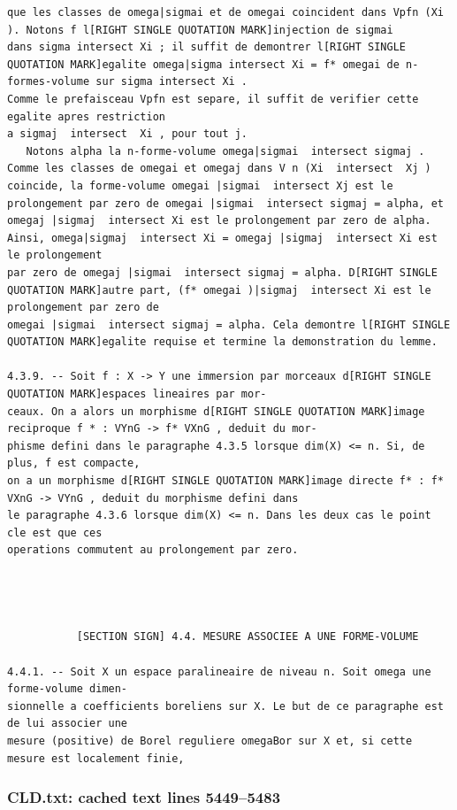 \documentclass[
  11pt,
]{article}
\begin{document}
\begin{lstlisting}
que les classes de omega|sigmai et de omegai coincident dans Vpfn (Xi ). Notons f l[RIGHT SINGLE QUOTATION MARK]injection de sigmai
dans sigma intersect Xi ; il suffit de demontrer l[RIGHT SINGLE QUOTATION MARK]egalite omega|sigma intersect Xi = f* omegai de n-formes-volume sur sigma intersect Xi .
Comme le prefaisceau Vpfn est separe, il suffit de verifier cette egalite apres restriction
a sigmaj  intersect  Xi , pour tout j.
   Notons alpha la n-forme-volume omega|sigmai  intersect sigmaj . Comme les classes de omegai et omegaj dans V n (Xi  intersect  Xj )
coincide, la forme-volume omegai |sigmai  intersect Xj est le prolongement par zero de omegai |sigmai  intersect sigmaj = alpha, et
omegaj |sigmaj  intersect Xi est le prolongement par zero de alpha. Ainsi, omega|sigmaj  intersect Xi = omegaj |sigmaj  intersect Xi est le prolongement
par zero de omegaj |sigmai  intersect sigmaj = alpha. D[RIGHT SINGLE QUOTATION MARK]autre part, (f* omegai )|sigmaj  intersect Xi est le prolongement par zero de
omegai |sigmai  intersect sigmaj = alpha. Cela demontre l[RIGHT SINGLE QUOTATION MARK]egalite requise et termine la demonstration du lemme.

4.3.9. -- Soit f : X -> Y une immersion par morceaux d[RIGHT SINGLE QUOTATION MARK]espaces lineaires par mor-
ceaux. On a alors un morphisme d[RIGHT SINGLE QUOTATION MARK]image reciproque f * : VYnG -> f* VXnG , deduit du mor-
phisme defini dans le paragraphe 4.3.5 lorsque dim(X) <= n. Si, de plus, f est compacte,
on a un morphisme d[RIGHT SINGLE QUOTATION MARK]image directe f* : f* VXnG -> VYnG , deduit du morphisme defini dans
le paragraphe 4.3.6 lorsque dim(X) <= n. Dans les deux cas le point cle est que ces
operations commutent au prolongement par zero.




           [SECTION SIGN] 4.4. MESURE ASSOCIEE A UNE FORME-VOLUME

4.4.1. -- Soit X un espace paralineaire de niveau n. Soit omega une forme-volume dimen-
sionnelle a coefficients boreliens sur X. Le but de ce paragraphe est de lui associer une
mesure (positive) de Borel reguliere omegaBor sur X et, si cette mesure est localement finie,
\end{lstlisting}

\subsubsection{CLD.txt: cached text lines
5449--5483}\label{cld.txt-cached-text-lines-54495483}
\end{document}
